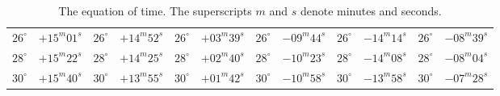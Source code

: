 \begin{table}[!h]
{\begin{tabular}{cr|cr|cr|cr|cr|cr}
$26^\circ$ & $+15^m01^s$ & $26^\circ$ & $+14^m52^s$ & $26^\circ$ & $+03^m39^s$ & $26^\circ$ & $-09^m44^s$ & $26^\circ$ & $-14^m14^s$ & $26^\circ$ & $-08^m39^s$\\
$28^\circ$ & $+15^m22^s$ & $28^\circ$ & $+14^m25^s$ & $28^\circ$ & $+02^m40^s$ & $28^\circ$ & $-10^m23^s$ & $28^\circ$ & $-14^m08^s$ & $28^\circ$ & $-08^m04^s$\\
$30^\circ$ & $+15^m40^s$ & $30^\circ$ & $+13^m55^s$ & $30^\circ$ & $+01^m42^s$ & $30^\circ$ & $-10^m58^s$ & $30^\circ$ & $-13^m58^s$ & $30^\circ$ & $-07^m28^s$\\
\end{tabular}}
\caption{The equation of time. The superscripts $m$ and $s$ denote minutes and seconds.}\label{ttime}
\end{table}

